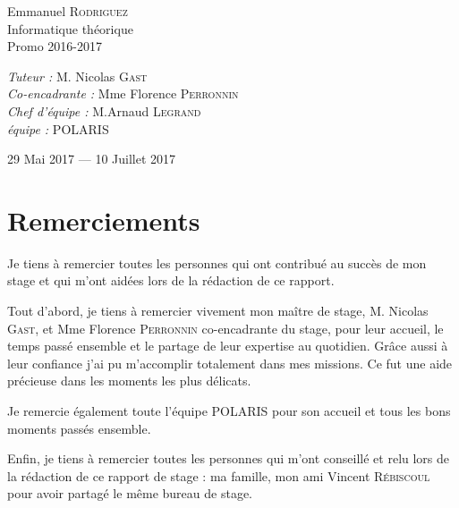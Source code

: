 \documentclass[a4paper,12pt]{report}
\begin{document}
\begin{titlepage}
\begin{sffamily}
\begin{center}
    \begin{minipage}[m]{0.55\textwidth}
      \begin{flushleft} \large
        Emmanuel \textsc{Rodriguez}\\
        Informatique théorique \\
        Promo 2016-2017\\
      \end{flushleft}
    \end{minipage}
    \begin{minipage}[m]{0.35\textwidth}
      \begin{flushright} \large
        \emph{Tuteur :} M. Nicolas \textsc{Gast}\\
        \emph{Co-encadrante :} Mme Florence \textsc{Perronnin}\\
        \emph{Chef d'équipe :} M.Arnaud \textsc{Legrand} \\
        \emph{équipe : } \textsc{POLARIS}
      \end{flushright}
    \end{minipage}

    \vfill

    {\large 29 Mai 2017 — 10 Juillet 2017}

  \end{center}
  \end{sffamily}
\end{titlepage}


\tableofcontents

\chapter*{Remerciements}

Je tiens à remercier toutes les personnes qui ont contribué au succès de mon stage et qui m'ont aidées lors de la rédaction de ce rapport.

Tout d'abord, je tiens à remercier vivement mon maître de stage, M.
Nicolas \textsc{Gast}, et Mme Florence \textsc{Perronnin} co-encadrante du stage, pour leur accueil, le temps passé ensemble et le partage de leur expertise au quotidien. Grâce aussi à leur confiance j'ai pu m'accomplir totalement dans mes missions. Ce fut une aide précieuse dans les moments les plus délicats.

Je remercie également toute l'équipe \textsc{POLARIS} pour son
accueil  et tous les bons moments passés ensemble.

Enfin, je tiens à remercier toutes les personnes qui m'ont conseillé
et relu lors de la rédaction de ce rapport de stage : ma famille, mon
ami Vincent \textsc{Rébiscoul} pour avoir partagé le même bureau de stage.
\end{document}
